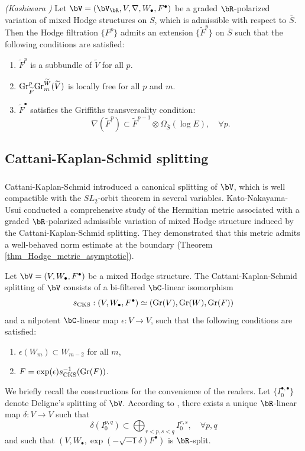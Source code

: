 \documentclass[11pt,letterpaper]{amsart}
\numberwithin{equation}{section}
\begin{document}
	\begin{prop} \emph{(Kashiwara \cite[Proposition 1.11.3]{Kashiwara1986})} \label{prop_Kashiwara_extendHodge}  
		Let $\bV = (\bV_{\bR}, V, \nabla, W_\bullet, F^\bullet)$ be a graded $\bR$-polarized variation of mixed Hodge structures on $S$, which is admissible with respect to $\overline{S}$. Then the Hodge filtration $\{F^p\}$ admits an extension $\{\widetilde{F}^p\}$ on $\overline{S}$ such that the following conditions are satisfied:  
		\begin{enumerate}  
			\item $\widetilde{F}^p$ is a subbundle of $\widetilde{V}$ for all $p$.  
			\item ${\rm Gr}_{\widetilde{F}}^p {\rm Gr}_m^{\widetilde{W}}(\widetilde{V})$ is locally free for all $p$ and $m$.  
			\item $\widetilde{F}^\bullet$ satisfies the Griffiths transversality condition:  
			$$
			\nabla(\widetilde{F}^p) \subset \widetilde{F}^{p-1} \otimes \Omega_{\overline{S}}(\log E), \quad \forall p.
			$$  
		\end{enumerate}  
	\end{prop}
	\iffalse
	\subsection{Cattani-Kaplan-Schmid splitting}
	\subsubsection{}
	Cattani-Kaplan-Schmid \cite{Cattani_Kaplan_Schmid1986} introduced a canonical splitting of $\bV$, which is well compactible with the $SL_2$-orbit theorem in several variables. Kato-Nakayama-Usui \cite{Kato2008} conducted a comprehensive study of the Hermitian metric associated with a graded $\bR$-polarized admissible variation of mixed Hodge structure induced by the Cattani-Kaplan-Schmid splitting. They demonstrated that this metric admits a well-behaved norm estimate at the boundary (Theorem \ref{thm_Hodge_metric_asymptotic}).
	
	Let $\bV = (V, W_\bullet, F^\bullet)$ be a mixed Hodge structure. The Cattani-Kaplan-Schmid splitting of $\bV$ consists of a bi-filtered $\bC$-linear isomorphism  
	$$
	s_{\rm CKS}: (V, W_\bullet, F^\bullet) \simeq ({\rm Gr}(V), {\rm Gr}(W), {\rm Gr}(F))
	$$  
	and a nilpotent $\bC$-linear map $\epsilon: V \to V$, such that the following conditions are satisfied:  
	\begin{enumerate}  
		\item $\epsilon(W_m) \subset W_{m-2}$ for all $m$,  
		\item $F = \exp(\epsilon) s^{-1}_{\rm CKS}({\rm Gr}(F))$.  
	\end{enumerate}
	We briefly recall the constructions for the convenience of the readers. Let $\{I^{\bullet,\bullet}_0\}$ denote Deligne's splitting of $\bV$. According to \cite[Proposition 2.20]{Cattani_Kaplan_Schmid1986}, there exists a unique $\bR$-linear map $\delta: V \to V$ such that  
	$$
	\delta(I^{p,q}_0) \subset \bigoplus_{r < p, s < q} I_0^{r,s}, \quad \forall p,q
	$$  
	and such that $(V, W_\bullet, \exp(-\sqrt{-1}\delta)F^\bullet)$ is $\bR$-split.  
	
\end{document}
